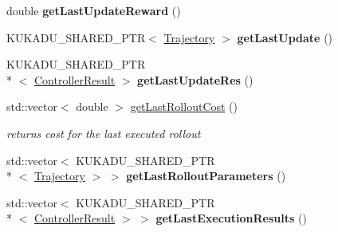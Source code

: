 \begin{DoxyCompactItemize}
\item 
\hypertarget{classkukadu_1_1GeneralReinforcer_aa65904e99bffab1272d49b01d515a670}{double {\bfseries get\-Last\-Update\-Reward} ()}\label{classkukadu_1_1GeneralReinforcer_aa65904e99bffab1272d49b01d515a670}

\item 
\hypertarget{classkukadu_1_1GeneralReinforcer_a19213b562d0a5a0320347e51ae108f9e}{K\-U\-K\-A\-D\-U\-\_\-\-S\-H\-A\-R\-E\-D\-\_\-\-P\-T\-R$<$ \hyperlink{classkukadu_1_1Trajectory}{Trajectory} $>$ {\bfseries get\-Last\-Update} ()}\label{classkukadu_1_1GeneralReinforcer_a19213b562d0a5a0320347e51ae108f9e}

\item 
\hypertarget{classkukadu_1_1GeneralReinforcer_a7aa17bfed379c5673d81eb17db4b4932}{K\-U\-K\-A\-D\-U\-\_\-\-S\-H\-A\-R\-E\-D\-\_\-\-P\-T\-R\\*
$<$ \hyperlink{classkukadu_1_1ControllerResult}{Controller\-Result} $>$ {\bfseries get\-Last\-Update\-Res} ()}\label{classkukadu_1_1GeneralReinforcer_a7aa17bfed379c5673d81eb17db4b4932}

\item 
\hypertarget{classkukadu_1_1GeneralReinforcer_a5c26cdef91f856f34c528547eee94472}{std\-::vector$<$ double $>$ \hyperlink{classkukadu_1_1GeneralReinforcer_a5c26cdef91f856f34c528547eee94472}{get\-Last\-Rollout\-Cost} ()}\label{classkukadu_1_1GeneralReinforcer_a5c26cdef91f856f34c528547eee94472}

\begin{DoxyCompactList}\small\item\em returns cost for the last executed rollout \end{DoxyCompactList}\item 
\hypertarget{classkukadu_1_1GeneralReinforcer_a4223bf864a5fe99bd42fe92c7e453869}{std\-::vector$<$ K\-U\-K\-A\-D\-U\-\_\-\-S\-H\-A\-R\-E\-D\-\_\-\-P\-T\-R\\*
$<$ \hyperlink{classkukadu_1_1Trajectory}{Trajectory} $>$ $>$ {\bfseries get\-Last\-Rollout\-Parameters} ()}\label{classkukadu_1_1GeneralReinforcer_a4223bf864a5fe99bd42fe92c7e453869}

\item 
\hypertarget{classkukadu_1_1GeneralReinforcer_a1ed63236a3d31d26152ffb9f01f5363a}{std\-::vector$<$ K\-U\-K\-A\-D\-U\-\_\-\-S\-H\-A\-R\-E\-D\-\_\-\-P\-T\-R\\*
$<$ \hyperlink{classkukadu_1_1ControllerResult}{Controller\-Result} $>$ $>$ {\bfseries get\-Last\-Execution\-Results} ()}\label{classkukadu_1_1GeneralReinforcer_a1ed63236a3d31d26152ffb9f01f5363a}


\end{DoxyCompactItemize}
